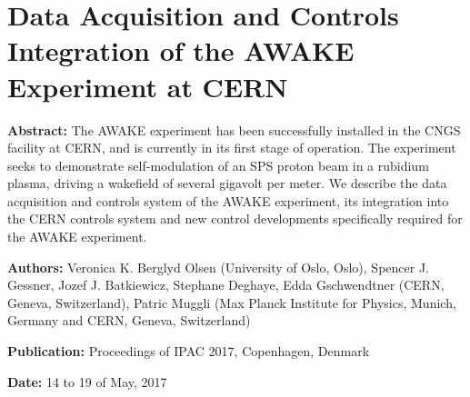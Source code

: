%
%

\chapter{Data Acquisition and Controls Integration of the AWAKE Experiment at CERN}
\label{Pub:IPAC17}

\begin{hangparas}{10mm}{1}

    \textbf{Abstract:}
    The AWAKE experiment has been successfully installed in the CNGS facility at CERN, and is     currently in its first stage of operation. The experiment seeks to demonstrate self-modulation of an SPS proton beam in a rubidium plasma, driving a wakefield of several gigavolt per meter. We describe the data acquisition and controls system of the AWAKE experiment, its integration into the CERN controls system and new control developments specifically required for the AWAKE experiment.

    \vspace{8mm}

    \textbf{Authors:}
    Veronica K. Berglyd Olsen (University of Oslo, Oslo),
    Spencer J. Gessner,
    Jozef J. Batkiewicz,
    Stephane Deghaye,
    Edda Gschwendtner (CERN, Geneva, Switzerland),
    Patric Muggli (Max Planck Institute for Physics, Munich, Germany and CERN, Geneva, Switzerland)

    \vspace{5mm}

    \textbf{Publication:}
    Proceedings of IPAC 2017, Copenhagen, Denmark

    \vspace{5mm}

    \textbf{Date:} 14 to 19 of May, 2017

\end{hangparas}
